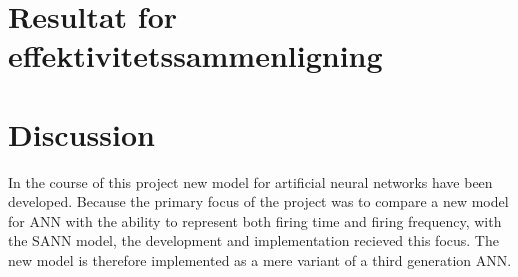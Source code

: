 
%
%
%



\section{Resultat for effektivitetssammenligning}



\section{Discussion}
In the course of this project new model for artificial neural networks have been developed. 
Because the primary focus of the project was to compare a new model for ANN with the ability to represent both firing time and firing frequency, with the SANN model, the development and implementation recieved this focus. 
The new model is therefore implemented as a mere variant of a third generation ANN.

